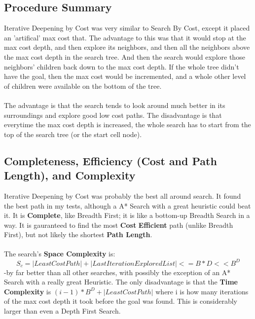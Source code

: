 \documentclass[12pt]{article}
\begin{document}
	\subsection{Procedure Summary}
	Iterative Deepening by Cost was very similar to Search By Cost, except it placed an 'artifical' max cost that. The advantage to this was that it would stop at the max cost depth, and then explore its neighbors, and then all the neighbors above the max cost depth in the search tree. And then the search would explore those neighbors' children back down to the max cost depth. If the whole tree didn't have the goal, then the max cost would be incremented, and a whole other level of children were available on the bottom of the tree. 
	\\ \\
	The advantage is that the search tends to look around much better in its surroundings and explore good low cost paths. The disadvantage is that everytime the max cost depth is increased, the whole search has to start from the top of the search tree (or the start cell node). 

	\subsection{Completeness, Efficiency (Cost and Path Length), and Complexity}
	Iterative Deepening by Cost was probably the best all around search. It found the best path in my tests, although a A* Search with a great heuristic could beat it. It is \textbf{Complete}, like Breadth First; it is like a bottom-up Breadth Search in a way. It is gauranteed to find the most \textbf{Cost} \textbf{Efficient} path (unlike Breadth First), but not likely the shortest \textbf{Path Length}. 
	\\ \\
	The search's \textbf{Space Complexity} is:
		\begin{equation}
			S_c =|Least Cost Path| + |Last Iteration Explored List| <= B * D << B^D
		\end{equation}
	 -by far better than all other searches, with possibly the exception of an A* Search with a really great Heuristic. The only disadvantage is that the \textbf{Time Complexity} is $ {(i - 1) * B^D} + |Least Cost Path|$ where i is how many iterations of the max cost depth it took before the goal was found. This is considerably larger than even a Depth First Search.
\end{document}
